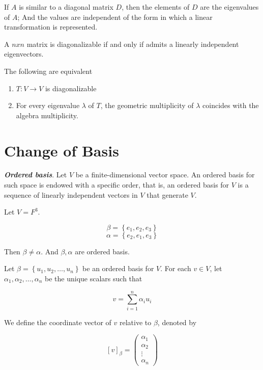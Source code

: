 \documentclass{report}
\begin{document}
    \begin{thBox}
        If $A$ is similar to a diagonal matrix $D$, then the elements of $D$ are the eigenvalues of $A$; And the values are independent of the form in which a linear transformation is represented.
    \end{thBox}

    \begin{thBox}
        A $nxn$ matrix is diagonalizable if and only if admits a linearly independent eigenvectors.
    \end{thBox}

    \begin{thBox}
        The following are equivalent

        \begin{enumerate}
            \item $T: V \to V$ is diagonalizable
            \item For every eigenvalue $\lambda$ of $T$, the geometric multiplicity of $\lambda$ coincides with the algebra multiplicity.
        \end{enumerate}
    \end{thBox}

    \section{Change of Basis}

    \begin{defBox}
        \textit{\textbf{Ordered basis}}. Let $V$ be a finite-dimensional vector space. An ordered basis for such space is endowed with a specific order, that is, an ordered basis for $V$ is a sequence of linearly independent vectors in $V$ that generate $V$.
    \end{defBox}

    \begin{Example}
        Let $V = F^3$.

        $$\beta = \left\{ e_1, e_2, e_3 \right\}$$
        $$\alpha = \left\{ e_2, e_1, e_3 \right\}$$

        Then $\beta \not = \alpha$. And $\beta, \alpha$ are ordered basis.
    \end{Example}

    \begin{defBox}
        Let $\beta = \left\{ u_1, u_2, \dots , u_n \right\}$ be an ordered basis for $V$. For each $v \in V$, let $\alpha_1, \alpha_2, \dots , \alpha_n$ be the unique scalars such that

        $$v = \sum_{i=1}^{n}\alpha_iu_i$$

        We define the coordinate vector of $v$ relative to $\beta$, denoted by

        $$[v]_\beta = \begin{pmatrix}
            \alpha_1\\ \alpha_2 \\ \vdots \\ \alpha_n
        \end{pmatrix}$$
    \end{defBox}
\end{document}
